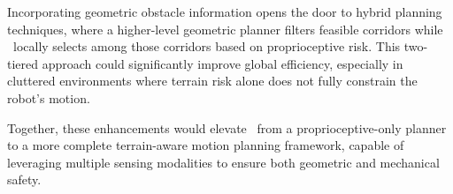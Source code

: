 Incorporating geometric obstacle information  opens the door to hybrid planning techniques, where a higher-level geometric planner filters feasible corridors while \algoname\ locally selects among those corridors based on proprioceptive risk. This two-tiered approach could significantly improve global efficiency, especially in cluttered environments where terrain risk alone does not fully constrain the robot’s motion.

Together, these enhancements would elevate \algoname\ from a proprioceptive-only planner to a more complete terrain-aware motion planning framework, capable of leveraging multiple sensing modalities to ensure both geometric and mechanical safety.
